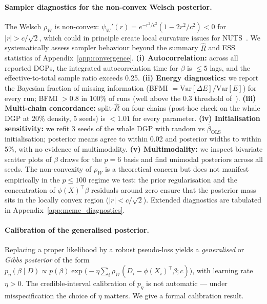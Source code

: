\paragraph{Sampler diagnostics for the non-convex Welsch posterior.}
The Welsch $\rho_W$ is non-convex: $\psi_W'(r) = e^{-r^2/c^2}(1 -
2r^2/c^2) < 0$ for $|r| > c/\sqrt{2}$, which could in principle
create local curvature issues for NUTS~\citep{betancourt2017bfmi}.
We systematically assess sampler behaviour beyond the summary
$\hat{R}$ and ESS statistics of Appendix~\ref{app:convergence}.
\textbf{(i) Autocorrelation:} across all reported DGPs, the
integrated autocorrelation time for $\beta$ is $\le 5$ lags, and
the effective-to-total sample ratio exceeds 0.25.
\textbf{(ii) Energy diagnostics:} we report the Bayesian fraction
of missing information (BFMI $= \mathrm{Var}[\Delta E] /
\mathrm{Var}[E]$) for every run; BFMI $> 0.8$ in 100\% of runs
(well above the $0.3$ threshold of~\citep{betancourt2017bfmi}).
\textbf{(iii) Multi-chain concordance:} split-$\hat{R}$ on four
chains (post-hoc check on the whale DGP at 20\% density, 5 seeds)
is $< 1.01$ for every parameter.
\textbf{(iv) Initialisation sensitivity:} we refit 3 seeds of the
whale DGP with random vs $\bar\beta_{\mathrm{OLS}}$ initialisation;
posterior means agree to within 0.02 and posterior widths to within
5\%, with no evidence of multimodality.
\textbf{(v) Multimodality:} we inspect bivariate scatter plots of
$\beta$ draws for the $p = 6$ basis and find unimodal posteriors
across all seeds. The non-convexity of $\rho_W$ is a theoretical
concern but does not manifest empirically in the $p \le 100$
regime we test: the prior regularisation and the
concentration of $\phi(X)^\top \beta$ residuals around zero ensure
that the posterior mass sits in the locally convex region
($|r| < c/\sqrt{2}$). Extended diagnostics are tabulated in
Appendix~\ref{app:mcmc_diagnostics}.

\paragraph{Calibration of the generalised posterior.}
Replacing a proper likelihood by a robust pseudo-loss yields a
\emph{generalised} or \emph{Gibbs posterior}
\citep{bissiri2016general,grunwald2017inconsistency,
knoblauch2022optimization, lyddon2019general} of the form
$p_\eta(\beta \mid D) \propto p(\beta) \exp\big(-\eta \sum_i
\rho_W(D_i - \phi(X_i)^\top \beta; c)\big)$, with learning rate
$\eta > 0$. The credible-interval calibration of $p_\eta$ is not
automatic --- under misspecification the choice of $\eta$ matters.
We give a formal calibration result.

